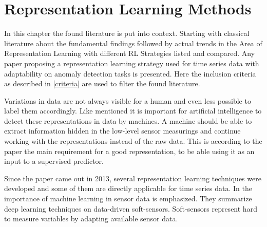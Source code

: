 \section{Representation Learning Methods}\label{review}
In this chapter the found literature is put into context. Starting with classical literature about the fundamental findings followed by actual trends in the Area of Representation Learning with different RL Strategies listed and compared. Any paper proposing a representation learning strategy used for time series data with adaptability on anomaly detection tasks is presented. Here the inclusion criteria as described in \ref{criteria} are used to filter the found literature.


Variations in data are not always visible for a human and even less possible to label them accordingly. Like  mentioned it is important for artificial intelligence to detect these representations in data by machines. A machine should be able to extract information hidden in the low-level sensor measurings and continue working with the representations instead of the raw data. This is according to the paper the main requirement for a good representation, to be able using it as an input to a supervised predictor.

Since the paper came out in 2013, several representation learning techniques were developed and some of them are directly applicable for time series data. In  the importance of machine learning in sensor data is emphasized. They summarize deep learning techniques on data-driven soft-sensors. Soft-sensors represent hard to measure variables by adapting available sensor data.%

